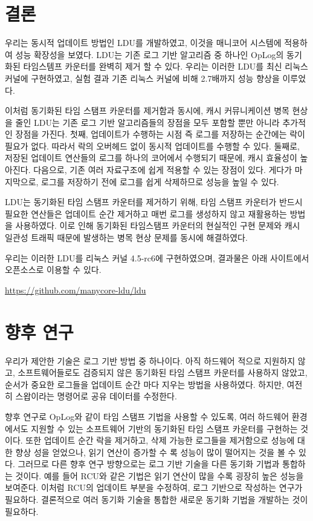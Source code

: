 
\section{결론}

우리는 동시적 업데이트 방법인 LDU를 개발하였고, 
이것을 매니코어 시스템에 적용하여 성능 확장성을 보였다.
LDU는 기존 로그 기반 알고리즘 중 하나인 OpLog의 동기화된 타임스템프 카운터를 완벽히 제거 할 수 있다. 
우리는 이러한 LDU를 최신 리눅스 커널에 구현하였고, 실험 결과 기존 리눅스 커널에 비해 2.7배까지 성능 향상을 이루었다. 

이처럼 동기화된 타임 스탬프 카운터를 제거함과 동시에, 캐시 커뮤니케이션 병목 현상을 줄인
LDU는 기존 로그 기반 알고리즘들의 장점을 모두 포함할 뿐만 아니라 추가적인 장점을 가진다.
첫째, 업데이트가 수행하는 시점 즉 로그를 저장하는 순간에는 락이 필요가 없다.
따라서 락의 오버헤드 없이 동시적 업데이트를 수행할 수 있다.
둘째로, 저장된 업데이트 연산들의 로그를 하나의 코어에서 수행되기 때문에, 
캐시 효율성이 높아진다.
다음으로, 기존 여러 자료구조에 쉽게 적용할 수 있는 장점이 있다.
게다가 마지막으로, 로그를 저장하기 전에 로그를 쉽게 삭제하므로 성능을 높일 수 있다. 

LDU는 동기화된 타임 스탬프 카운터를 제거하기 위해, 타임 스탬프 카운터가 반드시 필요한 연산들은 
업데이트 순간 제거하고 매번 로그를 생성하지 않고 재활용하는 방법을 사용하였다.
이로 인해 동기화된 타임스탬프 카운터의 현실적인 구현 문제와 캐시 일관성 트래픽 때문에 발생하는 
병목 현상 문제를 동시에 해결하였다.

우리는 이러한 LDU를 리눅스 커널 4.5-rc6에 구현하였으며, 결과물은
아래 사이트에서 오픈소스로 이용할 수 있다.
\begin{center}
\url{https://github.com/manycore-ldu/ldu}
\end{center}

\newpage
\section{향후 연구}

우리가 제안한 기술은 로그 기반 방법 중 하나이다. 
아직 하드웨어 적으로 지원하지 않고, 소프트웨어들로도 검증되지 않은 
동기화된 타임 스탬프 카운터를 사용하지 않았고, 순서가 중요한 로그들을 업데이트 순간 마다 지우는 방법을 사용하였다. 
하지만, 여전히 스왑이라는 명령어로 공유 데이터를 수정한다.

향후 연구로 OpLog와 같이 타임 스탬프 기법을 사용할 수 있도록, 
여러 하드웨어 환경에서도 지원할 수 있는 소프트웨어 기반의 동기화된 타임 스탬프 카운터를 구현하는 것이다.
또한 업데이트 순간 락을 제거하고, 삭제 가능한 로그들을 제거함으로 
성능에 대한 향상 성을 얻었으나, 읽기 연산이 증가할 수 록 성능이 많이 떨어지는 것을 볼 수 있다.
그러므로 다른 향후 연구 방향으로는 로그 기반 기술을 다른 동기화 기법과 통합하는 것이다. 
예를 들어 RCU와 같은 기법은 읽기 연산이 많을 수록 굉장히 높은 성능을 보여준다.
이처럼 RCU의 업데이트 부분을 수정하여, 로그 기반으로 작성하는 연구가 필요하다.
결론적으로 여러 동기화 기술을 통합한 새로운 동기화 기법을 개발하는 것이 필요하다.

